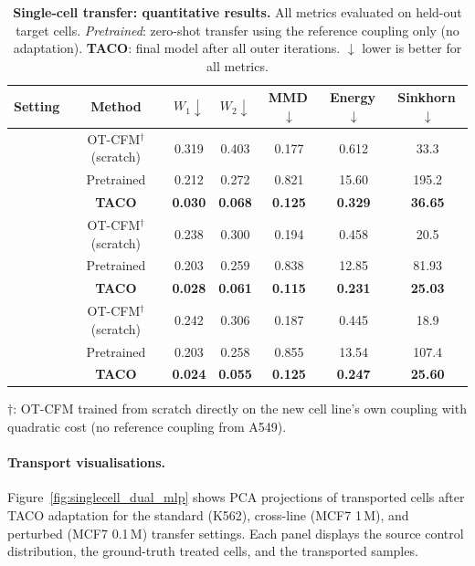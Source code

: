 \documentclass[11pt]{article}
\theoremstyle{definition}
\numberwithin{equation}{section}%
\begin{document}
\begin{table}[ht]
\centering
\caption{%
  \textbf{Single-cell transfer: quantitative results.}
  All metrics evaluated on held-out target cells.
  \textit{Pretrained}: zero-shot transfer using the reference coupling only (no adaptation).
  \textbf{TACO}: final model after all outer iterations.
  $\downarrow$ lower is better for all metrics.
}
\label{tab:singlecell_results}
\small
\setlength{\tabcolsep}{5pt}
\begin{tabular}{lc ccccc}
\toprule
Setting & Method & $W_1 \!\downarrow$ & $W_2 \!\downarrow$ & MMD\,$\downarrow$ & Energy\,$\downarrow$ & Sinkhorn\,$\downarrow$ \\
\midrule
{}
    & OT-CFM$^\dagger$ (scratch) & 0.319 & 0.403 & 0.177 & 0.612 & 33.3 \\
    & Pretrained      & 0.212 & 0.272 & 0.821 & 15.60 & 195.2 \\
  & \textbf{TACO}    & \textbf{0.030} & \textbf{0.068} & \textbf{0.125} & \textbf{0.329} & \textbf{36.65} \\
\midrule
{}
    & OT-CFM$^\dagger$ (scratch) & 0.238 & 0.300 & 0.194 & 0.458 & 20.5 \\
    & Pretrained      & 0.203 & 0.259 & 0.838 & 12.85 & 81.93 \\
  & \textbf{TACO}    & \textbf{0.028} & \textbf{0.061} & \textbf{0.115} & \textbf{0.231} & \textbf{25.03} \\
\midrule
{}
    & OT-CFM$^\dagger$ (scratch) & 0.242 & 0.306 & 0.187 & 0.445 & 18.9 \\
    & Pretrained      & 0.203 & 0.258 & 0.855 & 13.54 & 107.4 \\
  & \textbf{TACO}    & \textbf{0.024} & \textbf{0.055} & \textbf{0.125} & \textbf{0.247} & \textbf{25.60} \\
\bottomrule
\end{tabular}
\smallskip

\noindent\footnotesize $\dagger$: OT-CFM trained from scratch directly on the new cell line's own coupling with quadratic cost (no reference coupling from A549).
\end{table}

\paragraph{Transport visualisations.}
Figure~\ref{fig:singlecell_dual_mlp} shows PCA projections of transported cells after TACO adaptation for the standard (K562), cross-line (MCF7 1\,\textmu M), and perturbed (MCF7 0.1\,\textmu M) transfer settings.
Each panel displays the source control distribution, the ground-truth treated cells, and the transported samples.
\end{document}
